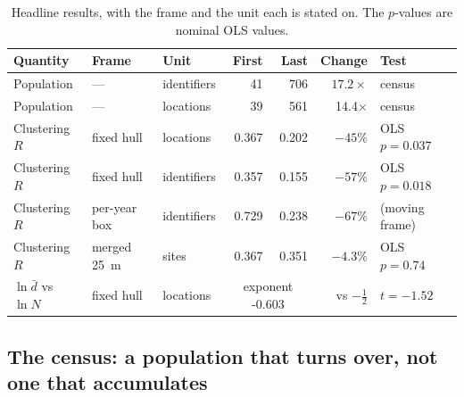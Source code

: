 \documentclass{article}
\newcommand{\nFirst}{41}
\newcommand{\nLast}{706}
\newcommand{\growth}{17.2}
\newcommand{\rFirst}{0.729}
\newcommand{\rLast}{0.238}
\newcommand{\rDrop}{67}
\newcommand{\growthLoc}{14.4}
\newcommand{\cleanSlopeLoc}{-0.603}
\newcommand{\cleanTLoc}{-1.52}
\newcommand{\hullLocOlsP}{0.037}
\newcommand{\hullIdsOlsP}{0.018}
\newcommand{\locHullDrop}{45}
\newcommand{\rHullFirst}{0.357}
\newcommand{\rHullLast}{0.155}
\newcommand{\rHullDrop}{57}
\newcommand{\rHullLocFirst}{0.367}
\newcommand{\rHullLocLast}{0.202}
\begin{document}
\begin{table}[htbp]
\centering
\caption{Headline results, with the frame and the unit each is stated on. The $p$-values are nominal OLS values.}
\label{tab:summary}
\small
\setlength{\tabcolsep}{4pt}
\begin{tabular}{lllrrrl}
\toprule
Quantity & Frame & Unit & First & Last & Change & Test \\
\midrule
Population & --- & identifiers & \nFirst & \nLast & $\growth\times$ & census \\
Population & --- & locations & 39 & 561 & \growthLoc$\times$ & census \\
Clustering $R$ & fixed hull & locations & \rHullLocFirst & \rHullLocLast & $-\locHullDrop\%$ & OLS $p=\hullLocOlsP$ \\
Clustering $R$ & fixed hull & identifiers & \rHullFirst & \rHullLast & $-\rHullDrop\%$ & OLS $p=\hullIdsOlsP$ \\
Clustering $R$ & per-year box & identifiers & \rFirst & \rLast & $-\rDrop\%$ & (moving frame) \\
Clustering $R$ & merged \SI{25}{\meter} & sites & 0.367 & 0.351 & $-\num{4.3}\%$ & OLS $p = 0.74$ \\
$\ln\bar{d}$ vs $\ln N$ & fixed hull & locations & \multicolumn{2}{c}{exponent \cleanSlopeLoc} & vs $-\tfrac12$ & $t = \cleanTLoc$ \\
\bottomrule
\end{tabular}
\end{table}

\subsection{The census: a population that turns over, not one that accumulates}
\label{sec:results-population}
\end{document}
